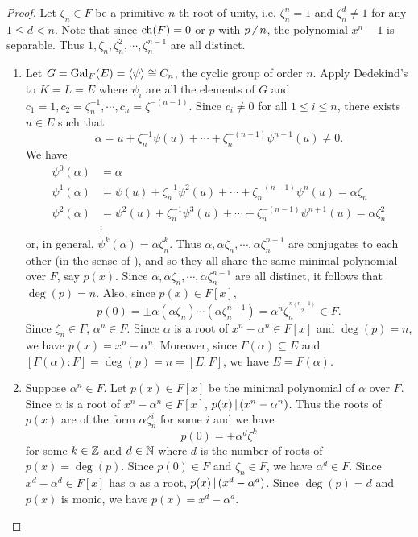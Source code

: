 \documentclass[11pt]{article}
\begin{document}
\begin{proof}
    Let $\zeta_n\in F$ be a primitive $n$-th root of unity, i.e. $\zeta_n^n=1$ and $\zeta_n^d\neq 1$ for any $1\leq d<n$. Note that since $\operatorname{ch}(F)=0$ or $p$ with $p\nd n$, the polynomial $x^n-1$ is separable. Thus $1,\zeta_n,\zeta_n^2,\cdots,\zeta_n^{n-1}$ are all distinct.
    \begin{enumerate}
        \item Let $G=\operatorname{Gal}_F(E)=\langle\psi\rangle\cong C_n$, the cyclic group of order $n$. Apply Dedekind's  to $K=L=E$ where $\psi_i$ are all the elements of $G$ and $c_1=1,c_2=\zeta_n^{-1},\cdots,c_n=\zeta^{-(n-1)}$. Since $c_i\neq0$ for all $1\leq i\leq n$, there exists $u\in E$ such that
        \[\alpha=u+\zeta_n^{-1}\psi(u)+\cdots+\zeta_n^{-(n-1)}\psi^{n-1}(u)\neq0.\]
        We have
        \begin{align*}
            \psi^0(\alpha)&=\alpha \\
            \psi^1(\alpha)&=\psi(u)+\zeta_n^{-1}\psi^2(u)+\cdots+\zeta_n^{-(n-1)}\psi^n(u)=\alpha\zeta_n \\
            \psi^2(\alpha)&=\psi^2(u)+\zeta_n^{-1}\psi^3(u)+\cdots+\zeta_n^{-(n-1)}\psi^{n+1}(u)=\alpha\zeta_n^2 \\
            &\vdots
        \end{align*}
        or, in general, $\psi^k(\alpha)=\alpha\zeta_n^k$. Thus $\alpha,\alpha\zeta_n,\cdots,\alpha\zeta_n^{n-1}$ are conjugates to each other (in the sense of ), and so they all share the same minimal polynomial over $F$, say $p(x)$. Since $\alpha,\alpha\zeta_n,\cdots,\alpha\zeta_n^{n-1}$ are all distinct, it follows that $\deg(p)=n$. Also, since $p(x)\in F[x]$,
        \[p(0)=\pm\alpha(\alpha\zeta_n)\cdots(\alpha\zeta_n^{n-1})=\alpha^n\zeta_n^{\frac{n(n-1)}{2}}\in F.\]
        Since $\zeta_n\in F$, $\alpha^n\in F$. Since $\alpha$ is a root of $x^n-\alpha^n\in F[x]$ and $\deg(p)=n$, we have $p(x)=x^n-\alpha^n$. Moreover, since $F(\alpha)\subseteq E$ and $[F(\alpha):F]=\deg(p)=n=[E:F]$, we have $E=F(\alpha)$.

        \item Suppose $\alpha^n\in F$. Let $p(x)\in F[x]$ be the minimal polynomial of $\alpha$ over $F$. Since $\alpha$ is a root of $x^n-\alpha^n\in F[x]$, $p(x)\,|\,(x^n-\alpha^n)$. Thus the roots of $p(x)$ are of the form $\alpha\zeta_n^i$ for some $i$ and we have
        \[p(0)=\pm\alpha^d\zeta^k\]
        for some $k\in\mathbb{Z}$ and $d\in\mathbb{N}$ where $d$ is the number of roots of $p(x)=\deg(p)$. Since $p(0)\in F$ and $\zeta_n\in F$, we have $\alpha^d\in F$. Since $x^d-\alpha^d\in F[x]$ has $\alpha$ as a root, $p(x)\,|\,(x^d-\alpha^d)$. Since $\deg(p)=d$ and $p(x)$ is monic, we have $p(x)=x^d-\alpha^d$.


\end{enumerate}
\end{proof}
\end{document}
